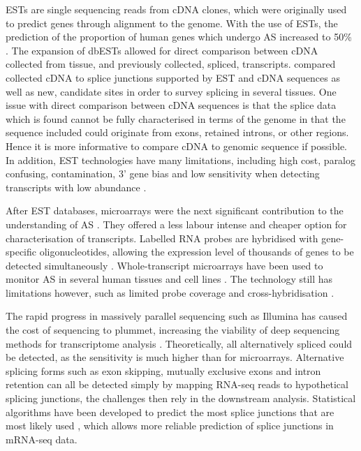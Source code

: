 \documentclass[12pt]{article}
\begin{document}
			ESTs are single sequencing reads from cDNA clones, which were originally used to predict genes through alignment to the genome. With the use of ESTs, the prediction of the proportion of human genes which undergo AS increased to 50\% \citep{Kan01,Brett02}. The expansion of dbESTs allowed for direct comparison between cDNA collected from tissue, and previously collected, spliced, transcripts. \citet{Pan08} compared collected cDNA to splice junctions supported by EST and cDNA sequences as well as new, candidate sites in order to survey splicing in several tissues. One issue with direct comparison between cDNA sequences is that the splice data which is found cannot be fully characterised in terms of the genome in that the sequence included could originate from exons, retained introns, or other regions. 
			Hence it is more informative to compare cDNA to genomic sequence if possible. 
			In addition, EST technologies have many limitations, including high cost, paralog confusing, contamination, 3' gene bias and low sensitivity when detecting transcripts with low abundance \citep{Lewis03, Florea06, Wang10}. 
			
			After EST databases, microarrays were the next significant contribution to the understanding of AS \citep{Johnson03}. They offered a less labour intense and cheaper option for characterisation of transcripts. Labelled RNA probes are hybridised with gene-specific oligonucleotides, allowing the expression level of thousands of genes to be detected simultaneously \citep{Hu01, Wang03}. 
			Whole-transcript microarrays have been used to monitor AS in several human tissues and cell lines \citep{Castle08}. The technology still has limitations however, such as limited probe coverage and cross-hybridisation \citep{Wang10}. 
			
			The rapid progress in massively parallel sequencing such as Illumina has caused the cost of sequencing to plummet, increasing the viability of deep sequencing methods for transcriptome analysis \citep{Blencowe09}. Theoretically, all alternatively spliced could be detected, as the sensitivity is much higher than for microarrays. Alternative splicing forms such as exon skipping, mutually exclusive exons and intron retention can all be detected simply by mapping RNA-seq reads to hypothetical splicing junctions, the challenges then rely in the downstream analysis. Statistical algorithms have been developed to predict the most splice junctions that are most likely used \citep{Wang10}, which allows more reliable prediction of splice junctions in mRNA-seq data.
			
\end{document}

